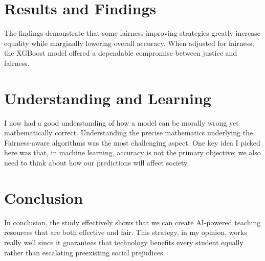 \documentclass[12pt]{article}
\begin{document}
\section{Results and Findings}
The findings demonstrate that some fairness-improving strategies greatly increase equality while marginally lowering overall accuracy. When adjusted for fairness, the XGBoost model offered a dependable compromise between justice and fairness.

\section{Understanding and Learning}
I now had a good understanding of how a model can be morally wrong yet mathematically correct. Understanding the precise mathematics underlying the Fairness-aware algorithms was the most challenging aspect. One key idea I picked here was that, in machine learning, accuracy is not the primary objective; we also need to think about how our predictions will affect society.

\section{Conclusion}
In conclusion, the study effectively shows that we can create AI-powered teaching resources that are both effective and fair. This strategy, in my opinion, works really well since it guarantees that technology benefits every student equally rather than escalating preexisting social prejudices.
\end{document}
